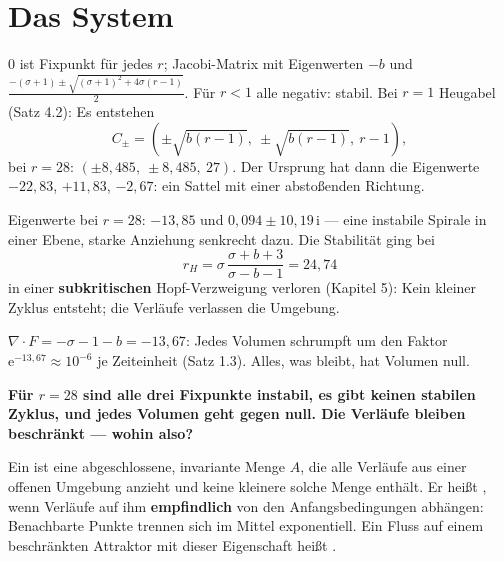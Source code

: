 \section{Das System}

\begin{merksatz}
$0$ ist Fixpunkt für jedes $r$; Jacobi-Matrix mit Eigenwerten $-b$ und $\frac{-(\sigma+1)\pm\sqrt{(\sigma+1)^{2} + 4\sigma(r-1)}}{2}$. Für $r < 1$ alle negativ: stabil. Bei $r = 1$ Heugabel (Satz 4.2): Es entstehen
\[ C_\pm = \left(\pm\sqrt{b(r-1)},\ \pm\sqrt{b(r-1)},\ r - 1\right) , \]
bei $r = 28$: $(\pm8{,}485,\ \pm8{,}485,\ 27)$. Der Ursprung hat dann die Eigenwerte $-22{,}83$, $+11{,}83$, $-2{,}67$: ein Sattel mit einer abstoßenden Richtung.

Eigenwerte bei $r = 28$: $-13{,}85$ und $0{,}094 \pm 10{,}19\,\mathrm i$ --- eine instabile Spirale in einer Ebene, starke Anziehung senkrecht dazu. Die Stabilität ging bei
\[ r_H = \sigma\,\frac{\sigma + b + 3}{\sigma - b - 1} = 24{,}74 \]
in einer \textbf{subkritischen} Hopf-Verzweigung verloren (Kapitel 5): Kein kleiner Zyklus entsteht; die Verläufe verlassen die Umgebung.

$\nabla\cdot F = -\sigma - 1 - b = -13{,}67$: Jedes Volumen schrumpft um den Faktor $\mathrm e^{-13{,}67} \approx 10^{-6}$ je Zeiteinheit (Satz 1.3). Alles, was bleibt, hat Volumen null.

\begin{center}
\begin{minipage}{0.9\textwidth}
\textbf{Für $r = 28$ sind alle drei Fixpunkte instabil, es gibt keinen stabilen Zyklus, und jedes Volumen geht gegen null. Die Verläufe bleiben beschränkt --- wohin also?}
\end{minipage}
\end{center}
\end{merksatz}

\begin{definition}
Ein  ist eine abgeschlossene, invariante Menge $A$, die alle Verläufe aus einer offenen Umgebung anzieht und keine kleinere solche Menge enthält. Er heißt , wenn Verläufe auf ihm \textbf{empfindlich} von den Anfangsbedingungen abhängen: Benachbarte Punkte trennen sich im Mittel exponentiell. Ein Fluss auf einem beschränkten Attraktor mit dieser Eigenschaft heißt .
\end{definition}

